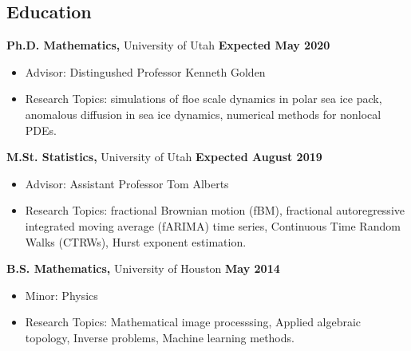 \documentclass[margin,line]{res}
\begin{document}
\newcommand{\myname}{Huy Dinh}
\newlength{\mynamewidth}
\settowidth{\mynamewidth}{\namefont\myname}

\name{\hspace*{0.5\textwidth}\hspace{-0.5\mynamewidth} \myname \vspace*{.2in}}

\thispagestyle{empty}

\begin{resume}



\section{\sc Education}
{\bf Ph.D. Mathematics,} University of Utah \hfill {\bf Expected May 2020}\\
\vspace*{-.1in}
\begin{itemize} \setlength\itemsep{0em}
\item[ ] Advisor: Distingushed Professor Kenneth Golden
\item[ ] Research Topics: simulations of floe scale dynamics in polar sea ice pack, anomalous diffusion in sea ice dynamics, numerical methods for nonlocal PDEs.
\end{itemize}

{\bf M.St. Statistics,} University of Utah \hfill {\bf Expected August 2019}\\
\vspace*{-.1in}
\begin{itemize} \setlength\itemsep{0em}
\item[ ] Advisor: Assistant Professor Tom Alberts
\item[ ] Research Topics: fractional Brownian motion (fBM), fractional autoregressive integrated moving average (fARIMA) time series, Continuous Time Random Walks (CTRWs), Hurst exponent estimation.
\end{itemize}

{\bf B.S. Mathematics,} University of Houston \hfill {\bf May 2014}\\
\vspace*{-.1in}
\begin{itemize} \setlength\itemsep{0em}
\item[ ] Minor: Physics
\item[ ] Research Topics: Mathematical image processsing, Applied algebraic topology, Inverse problems, Machine learning methods.
\end{itemize}


\end{resume}
\end{document}
